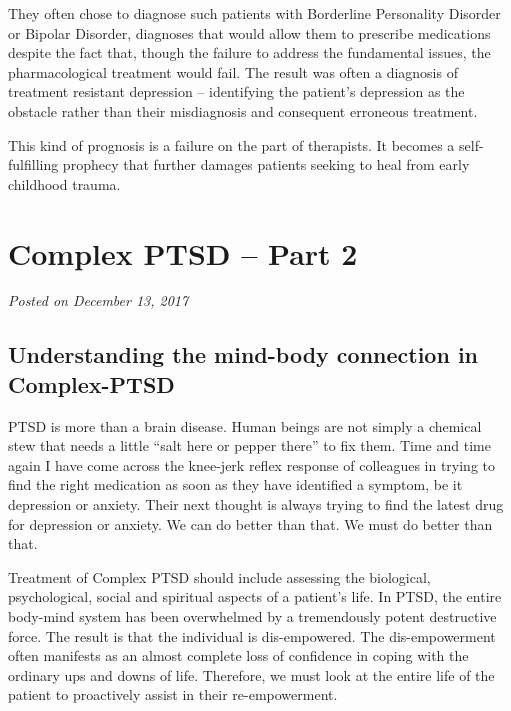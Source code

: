 \documentclass[]{book}
\begin{document}
They often chose to diagnose such patients with Borderline Personality Disorder or Bipolar Disorder, diagnoses that would allow them to prescribe medications despite the fact that, though the failure to address the fundamental issues, the pharmacological treatment would fail. The result was often a diagnosis of treatment resistant depression -- identifying the patient's depression as the obstacle rather than their misdiagnosis and consequent erroneous treatment.

This kind of prognosis is a failure on the part of therapists. It becomes a self-fulfilling prophecy that further damages patients seeking to heal from early childhood trauma.

\hypertarget{complex-ptsd-part-2}{%
\section{Complex PTSD -- Part 2}\label{complex-ptsd-part-2}}

\emph{Posted on December 13, 2017}

\hypertarget{understanding-the-mind-body-connection-in-complex-ptsd}{%
\subsection*{Understanding the mind-body connection in Complex-PTSD}\label{understanding-the-mind-body-connection-in-complex-ptsd}}

PTSD is more than a brain disease. Human beings are not simply a chemical stew that needs a little ``salt here or pepper there'' to fix them. Time and time again I have come across the knee-jerk reflex response of colleagues in trying to find the right medication as soon as they have identified a symptom, be it depression or anxiety. Their next thought is always trying to find the latest drug for depression or anxiety. We can do better than that. We must do better than that.

Treatment of Complex PTSD should include assessing the biological, psychological, social and spiritual aspects of a patient's life. In PTSD, the entire body-mind system has been overwhelmed by a tremendously potent destructive force. The result is that the individual is dis-empowered. The dis-empowerment often manifests as an almost complete loss of confidence in coping with the ordinary ups and downs of life. Therefore, we must look at the entire life of the patient to proactively assist in their re-empowerment.
\end{document}
